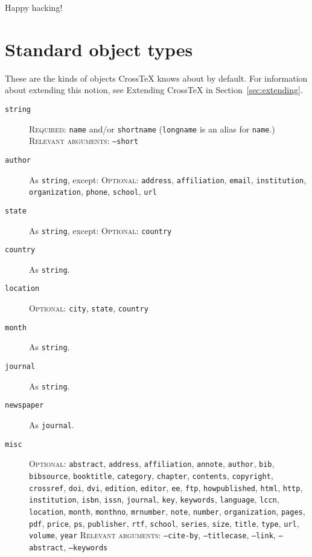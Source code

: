 \documentclass{article}
\newcommand{\XTX}{Cross\TeX}
\begin{document}
Happy hacking!


\appendix
\section{Standard object types\label{sec:standard}}

These are the kinds of objects \XTX{} knows about by default. For
information about extending this notion, see Extending \XTX{} in
Section~\ref{sec:extending}.

\begin{description}

\item[\texttt{string}]
\textsc{Required:} \texttt{name} and/or \texttt{shortname}
(\texttt{longname} is an alias for \texttt{name}.)
\textsc{Relevant arguments:} \texttt{--short}

\item[\texttt{author}] As \texttt{string}, except:
\textsc{Optional:} \texttt{address}, \texttt{affiliation}, \texttt{email},
\texttt{institution}, \texttt{organization}, \texttt{phone},
\texttt{school}, \texttt{url}

\item[\texttt{state}] As \texttt{string}, except:
\textsc{Optional:} \texttt{country}

\item[\texttt{country}] As \texttt{string}.

\item[\texttt{location}]
\textsc{Optional:} \texttt{city}, \texttt{state}, \texttt{country}

\item[\texttt{month}] As \texttt{string}.

\item[\texttt{journal}] As \texttt{string}.

\item[\texttt{newspaper}] As \texttt{journal}.

\item[\texttt{misc}]
\textsc{Optional:}
\texttt{abstract},
\texttt{address},
\texttt{affiliation},
\texttt{annote},
\texttt{author},
\texttt{bib},
\texttt{bibsource},
\texttt{booktitle},
\texttt{category},
\texttt{chapter},
\texttt{contents},
\texttt{copyright},
\texttt{crossref},
\texttt{doi},
\texttt{dvi},
\texttt{edition},
\texttt{editor},
\texttt{ee},
\texttt{ftp},
\texttt{howpublished},
\texttt{html},
\texttt{http},
\texttt{institution},
\texttt{isbn},
\texttt{issn},
\texttt{journal},
\texttt{key},
\texttt{keywords},
\texttt{language},
\texttt{lccn},
\texttt{location},
\texttt{month},
\texttt{monthno},
\texttt{mrnumber},
\texttt{note},
\texttt{number},
\texttt{organization},
\texttt{pages},
\texttt{pdf},
\texttt{price},
\texttt{ps},
\texttt{publisher},
\texttt{rtf},
\texttt{school},
\texttt{series},
\texttt{size},
\texttt{title},
\texttt{type},
\texttt{url},
\texttt{volume},
\texttt{year}
\textsc{Relevant arguments:} \texttt{--cite-by}, \texttt{--titlecase},
\texttt{--link}, \texttt{--abstract}, \texttt{--keywords}


\end{description}
\end{document}
